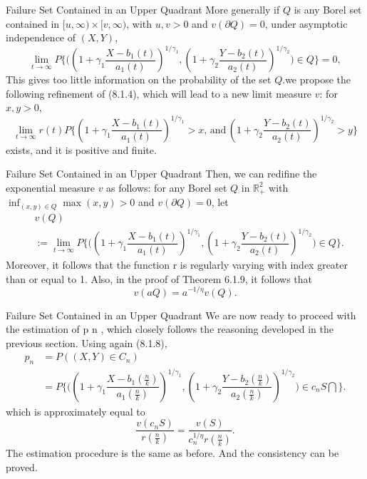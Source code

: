 \documentclass[11pt]{beamer}
\begin{document}
\begin{frame}{Failure Set Contained in an Upper Quadrant}
More generally if $Q$ is any Borel set contained in $[u,\infty)\times [v,\infty)$, with $u,v>0$ and $v(\partial Q)=0$, under asymptotic independence of $(X, Y)$,
\begin{displaymath}
\lim_{t\to \infty} P\{  \big(  (1+\gamma_1 \dfrac{X-b_1(t)}{a_1(t)})^{1/\gamma_1}, (1+\gamma_2 \dfrac{Y-b_2(t)}{a_2(t)})^{1/\gamma_2} \big) \in Q\}=0,
\end{displaymath}
This gives too little information on the probability of the set $Q$.we propose the following refinement of (8.1.4), which will lead to a new limit measure $v$: for $x,y>0$, 
\begin{displaymath}
\lim_{t\to \infty}r(t) P\big \{ (1+\gamma_1 \dfrac{X-b_1(t)}{a_1(t)})^{1/\gamma_1}>x ,\, \text{and}\,    (1+\gamma_2 \dfrac{Y-b_2(t)}{a_2(t)})^{1/\gamma_2}>y   \big  \}
\end{displaymath}
exists, and it is positive and finite.
\end{frame}


\begin{frame}{Failure Set Contained in an Upper Quadrant}
Then, we can redifine the exponential measure $v$ as follows: for any Borel set $Q$ in $\mathbb{R}_{+}^2$ with $\inf_{(x,y)\in Q} \max(x,y)>0$ and $v(\partial Q)=0$, let
\begin{displaymath}
\begin{split}
&v(Q)\\
  &:=\lim_{t\to \infty} P\{  \big(  (1+\gamma_1 \dfrac{X-b_1(t)}{a_1(t)})^{1/\gamma_1}, (1+\gamma_2 \dfrac{Y-b_2(t)}{a_2(t)})^{1/\gamma_2} \big) \in Q\}.
\end{split}
\end{displaymath}
Moreover, it follows that the function r is regularly varying with index greater than
or equal to 1. Also, in the proof of Theorem 6.1.9, it follows that
\begin{displaymath}
v(aQ)=a^{-1/\eta}v(Q).
\end{displaymath}
\end{frame}

\begin{frame}{Failure Set Contained in an Upper Quadrant}
We are now ready to proceed with the estimation of p n , which closely follows the
reasoning developed in the previous section. Using again (8.1.8),
\begin{displaymath}
\begin{split}
p_n&=P((X,Y)\in C_n)\\
 &=P\big \{ \big(    (1+\gamma_1 \dfrac{X-b_1(\frac{n}{k})}{a_1(\frac{n}{k})})^{1/\gamma_1}, (1+\gamma_2 \dfrac{Y-b_2(\frac{n}{k})}{a_2(\frac{n}{k})})^{1/\gamma_2}            \big)\in c_n S\bigcap\}.
\end{split}
\end{displaymath}
which is approximately equal to
\begin{displaymath}
\dfrac{v(c_nS)}{r(\frac{n}{k})}=\dfrac{v(S)}{c_n^{1/\eta}r(\frac{n}{k})}.
\end{displaymath}
The estimation procedure is the same as before. And the consistency can be proved.
\end{frame}
\end{document}
